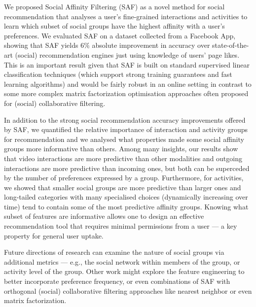 
We proposed Social Affinity Filtering (SAF) as a novel method for social
recommendation that analyses a user's fine-grained interactions and
activities to learn which subset of social groups have the highest affinity with
a user's preferences.  We evaluated SAF on a dataset collected from a
Facebook App, showing that SAF yields 6\% absolute improvement in
accuracy over state-of-the-art (social) recommendation engines just
using knowledge of users' page likes.  This is an important result
given that SAF is built on standard supervised linear classification
techniques (which support strong training guarantees and fast learning
algorithms) and would be fairly robust in an online setting 
in contrast to some more complex matrix factorization optimisation approaches
often proposed for (social) collaborative filtering.

In addition to the strong social recommendation accuracy improvements
offered by SAF, we quantified the relative importance of interaction
and activity groups for recommendation and we analysed what properties
made some social affinity groups more informative than others.  Among
many insights, our results show that video interactions are more
predictive than other modalities and outgoing interactions are more
predictive than incoming ones, but both can be superceded by the
number of preferences expressed by a group.  Furthermore, for
activities, we showed that smaller social groups are more predictive
than larger ones and long-tailed categories with many specialised
choices (dynamically increasing over time) tend to contain some of
the most predictive affinity groups.  Knowing what subset of features
are informative allows one to design an effective recommendation tool
that requires minimal permissions from a user --- a key property for
general user uptake.

Future directions of research can 
examine the nature of social groups via additional metrics --- e.g.,
the social network within members of the group, or activity level of
the group.  Other work might explore the feature engineering to better incorporate
preference frequency, or even combinations of SAF with
orthogonal (social) collaborative filtering approaches like nearest
neighbor or even matrix factorization.


